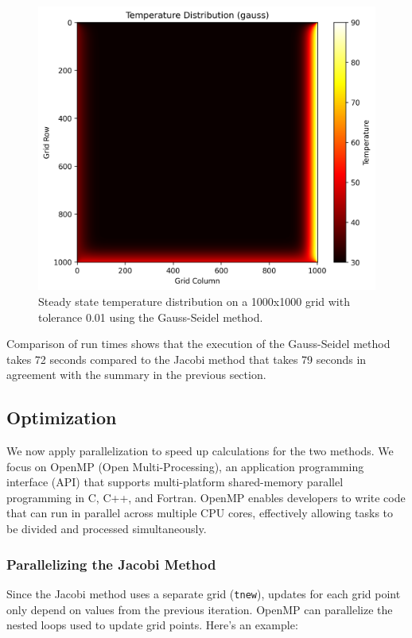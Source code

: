 \documentclass[11pt,a4paper]{article}
\begin{document}
\begin{figure}[!htb]
  \centering
  \includegraphics[width=0.7\linewidth]{../results/plots/temperature_distribution_gauss.png}
  \caption{Steady state temperature distribution on a 1000x1000 grid with 
  tolerance 0.01 using the Gauss-Seidel method.}
  \label{fig:temp-distro}
\end{figure}

Comparison of run times shows that the execution of the Gauss-Seidel method takes 72 seconds compared to the Jacobi method that takes 79 seconds in agreement with the summary in the previous section.

\subsection{Optimization}

We now apply parallelization to speed up calculations for the two methods.
We focus on OpenMP (Open Multi-Processing), 
an application programming interface (API) that supports multi-platform shared-memory parallel programming in C, C++, and Fortran. 
OpenMP enables developers to write code that can run in parallel across multiple CPU cores, 
effectively allowing tasks to be divided and processed simultaneously.

\subsubsection{Parallelizing the Jacobi Method}

Since the Jacobi method uses a separate grid (\texttt{tnew}), 
updates for each grid point only depend on values from the previous iteration.
OpenMP can parallelize the nested loops used to update grid points. 
Here’s an example:
\end{document}
